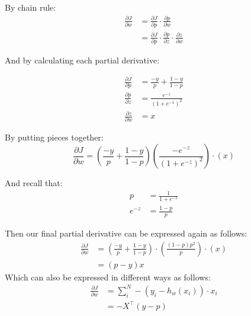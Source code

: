 \documentclass{article}
\begin{document}
By chain rule:
\begin{equation}
    \begin{split}
        \frac{\partial J}{\partial w} &= \frac{\partial J}{\partial p} \cdot \frac{\partial p}{\partial w}\\
        &=  \frac{\partial J}{\partial p} \cdot \frac{\partial p}{\partial z} \cdot \frac{\partial z}{\partial w} 
    \end{split}
\end{equation}

And by calculating each partial derivative:

\begin{equation}
    \begin{split}
        \frac{\partial J}{\partial p} &= \frac{-y}{p} + \frac{1-y}{1-p}\\
        \frac{\partial p}{\partial z} &= \frac{e^{-z}}{(1+e^{-1})^2}\\
        \frac{\partial z}{\partial w} &= x
    \end{split}
\end{equation}

By putting pieces together:
\begin{equation}
    \frac{\partial J}{\partial w} = \left( \frac{-y}{p} + \frac{1-y}{1-p} \right) \left(\frac{-e^{-z}}{(1+e^{-z})^2}\right) \cdot \left(x\right)
\end{equation}

And recall that:
\begin{equation}
    \begin{split}
        p &= \frac{1}{1+e^{-z}} \\
        e^{-z} &= \frac{1-p}{p}
    \end{split}
\end{equation}

Then our final partial derivative can be expressed again as follows:
\begin{equation}
    \begin{split}
        \frac{\partial J}{\partial w} &= \left( \frac{-y}{p} + \frac{1-y}{1-p} \right) \cdot \left( \frac{(1-p)p^2}{p} \right) \cdot \left( x \right) \\
        &= (p-y)x
    \end{split}
\end{equation}
Which can also be expressed in different ways as follows:
\begin{equation}
    \begin{split}
        \frac{\partial J}{\partial w} &= \sum^N_i -(y_i - h_w(x_i)) \cdot x_i \\
        &= -X^{\intercal}(y-p)
    \end{split}
\end{equation}
\end{document}
